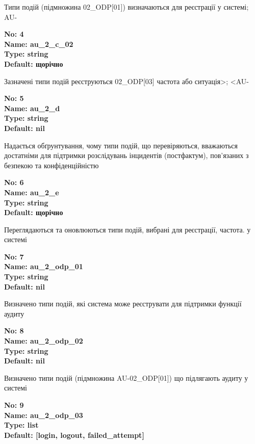 \documentclass{article}
\begin{document}
{\footnotesize Типи подій (підмножина 02\_\allowbreak{}ODP[01]) визначаються для реєстрації у системі; AU-}


{\footnotesize\bfseries
No: 4\\
Name: au\_\allowbreak{}2\_\allowbreak{}c\_\allowbreak{}02\\
Type: string\\
Default: \textquotedbl{}щорічно\textquotedbl{}
}

{\footnotesize Зазначені типи подій реєструються 02\_\allowbreak{}ODP[03] частота або ситуація>; <AU-}


{\footnotesize\bfseries
No: 5\\
Name: au\_\allowbreak{}2\_\allowbreak{}d\\
Type: string\\
Default: nil
}

{\footnotesize Надається обґрунтування, чому типи подій, що перевіряються, вважаються достатніми для підтримки розслідувань інцидентів (постфактум), пов'язаних з безпекою та конфіденційністю}


{\footnotesize\bfseries
No: 6\\
Name: au\_\allowbreak{}2\_\allowbreak{}e\\
Type: string\\
Default: \textquotedbl{}щорічно\textquotedbl{}
}

{\footnotesize Переглядаються та оновлюються типи подій, вибрані для реєстрації, частота. у системі}


{\footnotesize\bfseries
No: 7\\
Name: au\_\allowbreak{}2\_\allowbreak{}odp\_\allowbreak{}01\\
Type: string\\
Default: nil
}

{\footnotesize Визначено типи подій, які система може реєструвати для підтримки функції аудиту}


{\footnotesize\bfseries
No: 8\\
Name: au\_\allowbreak{}2\_\allowbreak{}odp\_\allowbreak{}02\\
Type: string\\
Default: nil
}

{\footnotesize Визначено типи подій (підмножина AU-02\_\allowbreak{}ODP[01]) що підлягають аудиту у системі}


{\footnotesize\bfseries
No: 9\\
Name: au\_\allowbreak{}2\_\allowbreak{}odp\_\allowbreak{}03\\
Type: list\\
Default: [\textquotedbl{}login\textquotedbl{}, \textquotedbl{}logout\textquotedbl{}, \textquotedbl{}failed\_\allowbreak{}attempt\textquotedbl{}]
}
\end{document}
